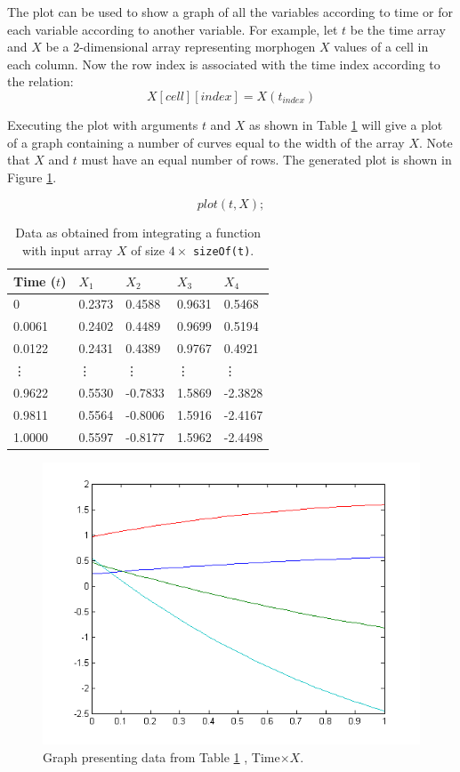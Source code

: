     The plot can be used to show a graph of all the variables according to time or for each variable according to another variable. For example, let $t$ be the time array and $X$ be a 2-dimensional array representing morphogen $X$ values of a cell in each column. Now the row index is associated with the time index according to the relation:
       $$ X[cell][index] = X(t_{index}) $$
    
Executing the plot with arguments $t$ and $X$ as shown in Table \ref{sampleData} will give a plot of a graph containing a number of curves equal to the width of the array $X$. Note that $X$ and $t$ must have an equal number of rows. The generated plot is shown in Figure \ref{samplePlot}.
    
    $$ plot(t, X); $$ 
\begin{table}
\begin{center}
\caption{Data as obtained from integrating a function with input array $X$ of size $4 \times$ \texttt{sizeOf(t)}.}
\label{sampleData}   
\begin{tabular}{| l | l | l | l | l |}
\hline
Time ($t$) & $ X_1 $ & $ X_2 $ & $ X_3 $ & $ X_4 $ \\ \hline
0 & 0.2373 & 0.4588 & 0.9631 & 0.5468 \\ \hline
0.0061 & 0.2402 & 0.4489 & 0.9699 & 0.5194 \\ \hline
0.0122 & 0.2431 & 0.4389 & 0.9767 & 0.4921 \\ \hline
\vdots & \vdots & \vdots & \vdots & \vdots \\ \hline
0.9622 & 0.5530 & -0.7833 & 1.5869 & -2.3828 \\ \hline
0.9811 & 0.5564 & -0.8006 & 1.5916 & -2.4167 \\ \hline
1.0000 & 0.5597 & -0.8177 & 1.5962 & -2.4498 \\ \hline
\end{tabular} 
\end{center}
\end{table}

\begin{figure}[h!]
\centering
\includegraphics[scale=0.5]{example_plot.png}
\caption{Graph presenting data from Table \ref{sampleData} \label{samplePlot}, Time$\times X$.}
\end{figure}
